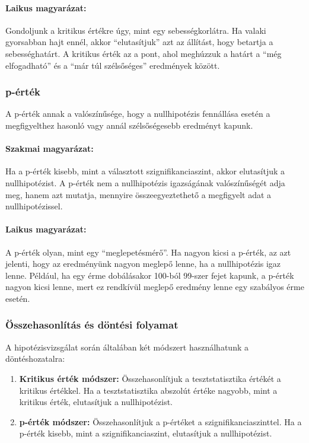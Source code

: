\documentclass[a4paper,12pt]{article}
\begin{document}
    \paragraph{Laikus magyarázat:} Gondoljunk a kritikus értékre úgy, mint egy sebességkorlátra. Ha valaki gyorsabban hajt ennél, akkor ``elutasítjuk'' azt az állítást, hogy betartja a sebességhatárt. A kritikus érték az a pont, ahol meghúzzuk a határt a ``még elfogadható'' és a ``már túl szélsőséges'' eredmények között.

    \subsubsection{p-érték}

    A p-érték annak a valószínűsége, hogy a nullhipotézis fennállása esetén a megfigyelthez hasonló vagy annál szélsőségesebb eredményt kapunk.

    \paragraph{Szakmai magyarázat:} Ha a p-érték kisebb, mint a választott szignifikanciaszint, akkor elutasítjuk a nullhipotézist. A p-érték nem a nullhipotézis igazságának valószínűségét adja meg, hanem azt mutatja, mennyire összeegyeztethető a megfigyelt adat a nullhipotézissel.

    \paragraph{Laikus magyarázat:} A p-érték olyan, mint egy ``meglepetésmérő''. Ha nagyon kicsi a p-érték, az azt jelenti, hogy az eredményünk nagyon meglepő lenne, ha a nullhipotézis igaz lenne. Például, ha egy érme dobálásakor 100-ból 99-szer fejet kapunk, a p-érték nagyon kicsi lenne, mert ez rendkívül meglepő eredmény lenne egy szabályos érme esetén.

    \subsubsection{Összehasonlítás és döntési folyamat}

    A hipotézisvizsgálat során általában két módszert használhatunk a döntéshozatalra:

    \begin{enumerate}
        \item \textbf{Kritikus érték módszer:} Összehasonlítjuk a tesztstatisztika értékét a kritikus értékkel. Ha a tesztstatisztika abszolút értéke nagyobb, mint a kritikus érték, elutasítjuk a nullhipotézist.

        \item \textbf{p-érték módszer:} Összehasonlítjuk a p-értéket a szignifikanciaszinttel. Ha a p-érték kisebb, mint a szignifikanciaszint, elutasítjuk a nullhipotézist.
    \end{enumerate}
\end{document}
